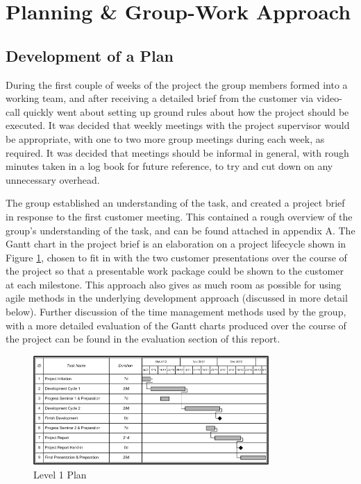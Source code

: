 \section{Planning \& Group-Work Approach}

\subsection{Development of a Plan}

During the first couple of weeks of the project the group members formed into a
working team,
and after receiving a detailed brief from the customer via video-call quickly
went about setting up ground rules about how the project should be executed. It
was decided that weekly meetings with the project supervisor would be
appropriate, with one to two more group meetings during each week, as required.
It was decided that meetings should be informal in general, with rough minutes
taken in a log book for future reference, to try and cut down on any unnecessary
 overhead.

The group established an understanding of the task, and created a project
brief in response to the first customer meeting. This contained a rough overview
of the group's understanding of the task, and can be found attached in appendix
A. The Gantt chart in the project brief is an elaboration on a project lifecycle
shown in Figure \ref{fig:l1plan-1}, chosen to fit in with the two customer
presentations over the course of the project so that a presentable work package
could be shown to the customer at each milestone. This approach also gives as
much room as possible
for using agile methods in the underlying development approach (discussed in
more detail below). Further discussion of the time management
methods used by the group, with a more detailed evaluation of the Gantt charts
produced over the course of the project can be found in the evaluation section
of this report.

\begin{figure}[htb]
\centering
\includegraphics[width=0.8\textwidth]{img/l1plan.png}
\caption{Level 1 Plan}
\label{fig:l1plan-1}
\end{figure}


